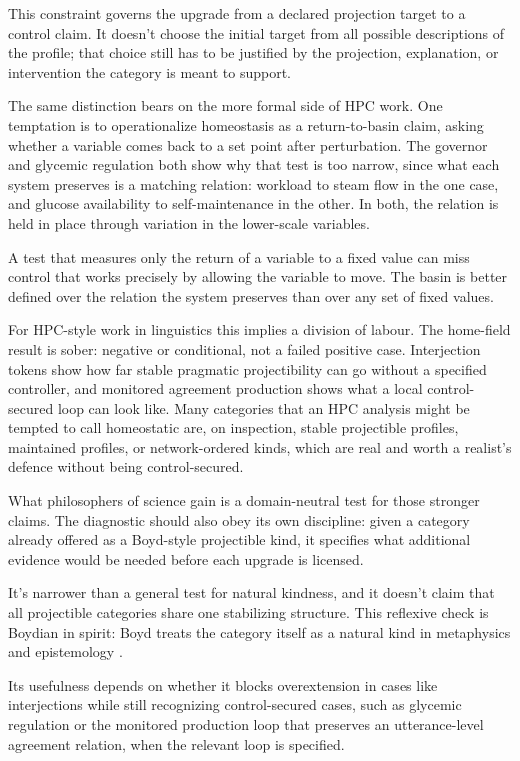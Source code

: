 \documentclass[12pt]{article}
\begin{document}
This constraint governs the upgrade from a declared projection target to a control
claim. It doesn't choose the initial target from all possible descriptions of the
profile; that choice still has to be justified by the projection, explanation, or
intervention the category is meant to support.

The same distinction bears on the more formal side of HPC work. One temptation is
to operationalize homeostasis as a return-to-basin claim, asking whether a
variable comes back to a set point after perturbation. The governor and glycemic
regulation both show why that test is too narrow, since what each system preserves is
a matching relation: workload to steam flow in the one case, and glucose
availability to self-maintenance in the other. In both, the relation is held in
place through variation in the lower-scale variables.

A test that measures only the return of a variable to a fixed value can miss
control that works precisely by allowing the variable to move. The basin is better
defined over the relation the system preserves than over any set of fixed values.

For HPC-style work in linguistics this implies a division of labour. The
home-field result is sober: negative or conditional, not a failed positive case.
Interjection tokens show how far stable pragmatic projectibility can go without a
specified controller, and monitored agreement production shows what a local
control-secured loop can look like. Many categories that an HPC analysis might be
tempted to call homeostatic are, on inspection, stable projectible profiles,
maintained profiles, or network-ordered kinds, which are real and worth a
realist's defence without being control-secured.

What philosophers of science gain is a domain-neutral test for those stronger
claims. The diagnostic should also obey its own discipline: given a category
already offered as a Boyd-style projectible kind, it specifies what additional
evidence would be needed before each upgrade is licensed.

It's narrower than a general test for natural kindness, and it doesn't claim that
all projectible categories share one stabilizing structure. This reflexive check
is Boydian in spirit: Boyd treats the category  itself as a
natural kind in metaphysics and epistemology \citep[168]{boyd1999}.

Its usefulness depends on whether it blocks overextension in cases like
interjections while still
recognizing control-secured cases, such as glycemic regulation or the monitored
production loop that preserves an utterance-level agreement relation, when the
relevant loop is specified.
\end{document}
